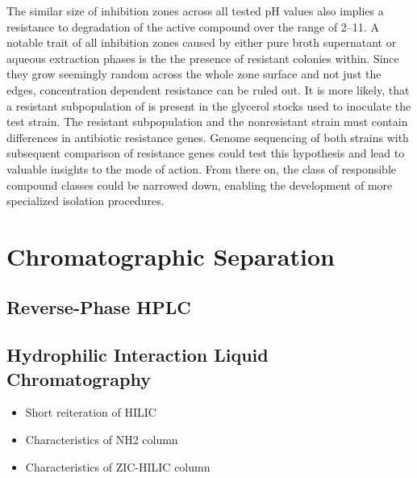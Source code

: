 The similar size of inhibition zones across all tested pH values also implies a resistance to degradation of the active compound over the range of 2--11.
A notable trait of all inhibition zones caused by either pure broth supernatant or aqueous extraction phases is the the presence of resistant colonies within.
Since they grow seemingly random across the whole zone surface and not just the edges, concentration dependent resistance can be ruled out.
It is more likely, that a resistant subpopulation of \coli{} is present in the glycerol stocks used to inoculate the test strain.
The resistant subpopulation and the nonresistant strain must contain differences in antibiotic resistance genes.
Genome sequencing of both strains with subsequent comparison of resistance genes could test this hypothesis and lead to valuable insights to the mode of action.
From there on, the class of responsible compound classes could be narrowed down, enabling the development of more specialized isolation procedures.




\section{Chromatographic Separation} %
\label{sec:results_chromatographic_separation}

\subsection{Reverse-Phase HPLC} %
\label{sub:results_reverse_phase_hplc}


\subsection{Hydrophilic Interaction Liquid Chromatography} %
\label{sub:results_hydrophilic_interaction_chromatography}

\begin{itemize}
	\item Short reiteration of HILIC
	\item Characteristics of NH2 column
	\item Characteristics of ZIC-HILIC column
\end{itemize}

